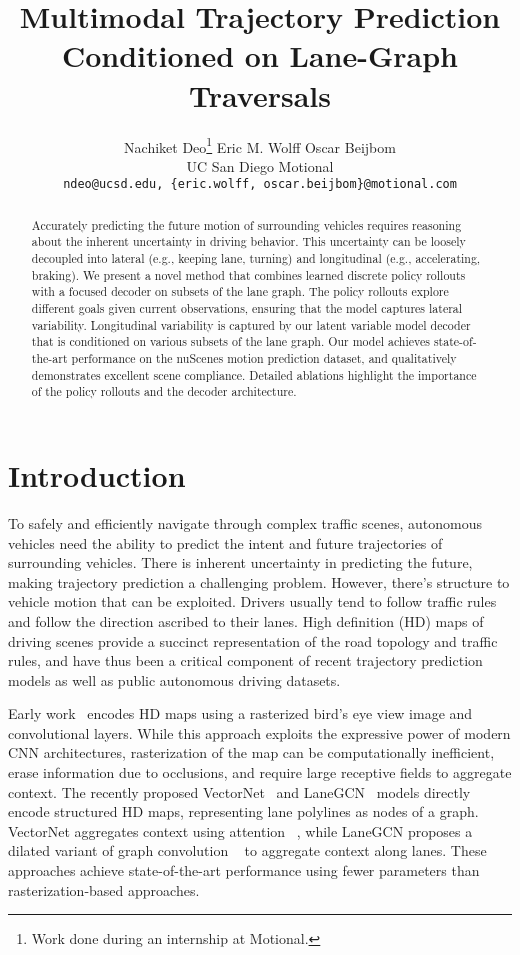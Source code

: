 \documentclass{article}
\title{Multimodal Trajectory Prediction Conditioned on Lane-Graph Traversals}
\author{
  
  Nachiket Deo\thanks{Work done during an internship at Motional.} \qquad Eric M. Wolff \qquad Oscar Beijbom\\
  UC San 
  Diego \qquad Motional \\
  \texttt{ndeo@ucsd.edu, \{eric.wolff, oscar.beijbom\}@motional.com} \\

}
\begin{document}
\maketitle

\begin{abstract}


Accurately predicting the future motion of surrounding vehicles requires reasoning about the inherent uncertainty in driving behavior.
This uncertainty can be loosely decoupled into lateral (e.g., keeping lane, turning) and longitudinal (e.g., accelerating, braking).
We present a novel method that combines learned discrete policy rollouts with a focused decoder on subsets of the lane graph.
The policy rollouts explore different goals given current observations, ensuring that the model captures lateral variability.
Longitudinal variability is captured by our latent variable model decoder that is conditioned on various subsets of the lane graph.
Our model achieves state-of-the-art performance on the nuScenes motion prediction dataset, and qualitatively demonstrates excellent scene compliance.
Detailed ablations highlight the importance of the policy rollouts and the decoder architecture.
\end{abstract}




\section{Introduction}
\label{sec:intro}	




To safely and efficiently navigate through complex traffic scenes, autonomous vehicles need the ability to predict the intent and future trajectories of surrounding vehicles.
There is inherent uncertainty in predicting the future, making trajectory prediction a challenging problem. 
However, there's structure to vehicle motion that can be exploited. Drivers usually tend to follow traffic rules and follow the direction ascribed to their lanes. High definition (HD) maps of driving scenes provide a succinct representation of the road topology and traffic rules, and have thus been a critical component of recent trajectory prediction models as well as public autonomous driving datasets. 


Early work~\citep{cui2019multimodal} encodes HD maps using a rasterized bird's eye view image and convolutional layers.
While this approach exploits the expressive power of modern CNN architectures, rasterization of the map can be computationally inefficient, erase information due to occlusions, and require large receptive fields to aggregate context. The recently proposed VectorNet~\citep{gao2020vectornet} and LaneGCN~\citep{liang2020laneGcn} models directly encode structured HD maps, representing lane polylines as nodes of a graph.
VectorNet aggregates context using attention ~\citep{vaswani2017attention}, while LaneGCN proposes a dilated variant of graph convolution ~\citep{kipf2016semi} to aggregate context along lanes. These approaches achieve state-of-the-art performance using fewer parameters than rasterization-based approaches.
\end{document}
